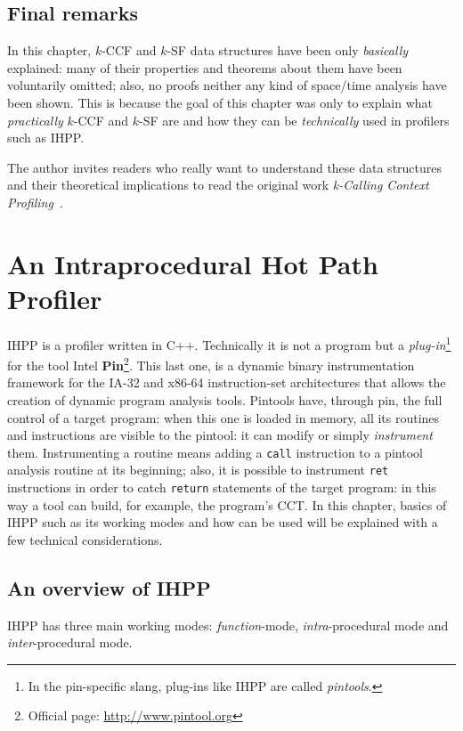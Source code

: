 \documentclass[a4paper,10pt]{report}
\begin{document}
\section{Final remarks}

In this chapter, $k$-CCF and $k$-SF data structures have been only \emph{basically} explained: many of their properties and theorems about them have been voluntarily omitted; 
also, no proofs neither any kind of space\slash time analysis have been shown.
This is because the goal of this chapter was only to explain what \emph{practically} $k$-CCF and $k$-SF are and how they can be \emph{technically} used in profilers such as IHPP. 

The author invites readers who really want to understand these data structures and their theoretical implications to read the original work \emph{k-Calling Context Profiling}~\cite{kccf}.


\chapter{An Intraprocedural Hot Path Profiler}

IHPP is a profiler written in C++. Technically it is not a program but
 a \emph{plug-in}\footnote{In the pin-specific slang,
plug-ins like IHPP are called \emph{pintools}.} for the tool 
Intel \textbf{Pin}\footnote{Official page: \url{http://www.pintool.org}}.
This last one, is a dynamic binary instrumentation framework for the IA-32 and x86-64 instruction-set architectures that allows the creation of dynamic program analysis tools. 
Pintools have, through pin, the full control of a target program: 
when this one is loaded in memory, all its routines and instructions are visible
to the pintool: it can modify or simply \emph{instrument} them. 
Instrumenting a routine means adding a \verb|call| instruction to a pintool analysis 
routine at its beginning; also, it is possible to instrument \verb|ret| instructions 
in order to catch \verb|return| statements of the target program: 
in this way a tool can build, for example, the program's CCT.
In this chapter, basics of IHPP such as its working modes and how can be used will be explained with a few technical considerations.

\section{An overview of IHPP}

IHPP has three main working modes: \emph{function}-mode, \emph{intra}-procedural mode and \emph{inter}-procedural mode. 
\end{document}
